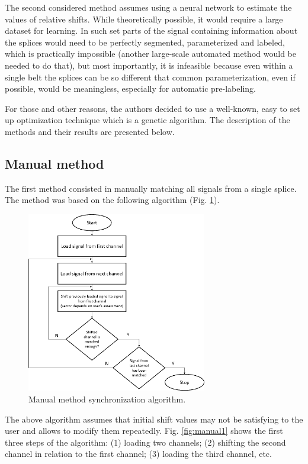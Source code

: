\documentclass[applsci,article,preprint,moreauthors,pdftex]{Definitions/mdpi}
\begin{document}
The second considered method assumes using a neural network to estimate the values of relative shifts. While theoretically possible, it would require a large dataset for learning. In such set parts of the signal containing information about the splices would need to be perfectly segmented, parameterized and labeled, which is practically impossible (another large-scale automated method would be needed to do that), but most importantly, it is infeasible because even within a single belt the splices can be so different that common parameterization, even if possible, would be meaningless, especially for automatic pre-labeling.

For those and other reasons, the authors decided to use a well-known, easy to set up optimization technique which is a genetic algorithm. The description of the methods and their results are presented below.

\subsection{Manual method}

The first method consisted in manually matching all signals from a single splice.  The method was based on the following algorithm (Fig. \ref{fig:block1}).

\begin{figure}[ht!]
\centering
\includegraphics[width=0.7\textwidth]{figs/block1.png}
\caption{Manual method synchronization algorithm.}
\label{fig:block1}
\end{figure}

The above algorithm assumes that initial shift values may not be satisfying to the user and allows to modify them repeatedly. Fig. \ref{fig:manual1} shows the first three steps of the algorithm: (1) loading two channels; (2) shifting the second channel in relation to the first channel; (3) loading the third channel, etc.
\end{document}
